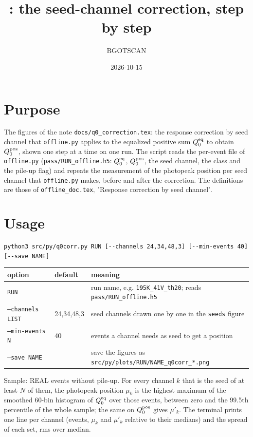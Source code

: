 \documentclass[11pt]{article}
\title{\code{q0corr.py}: the seed-channel correction, step by step}
\author{BGOTSCAN}
\date{2026-10-15}
\newcommand{\code}[1]{\texttt{#1}}
\begin{document}
\maketitle

\section{Purpose}

The figures of the note \code{docs/q0\_correction.tex}: the response
correction by seed channel that \code{offline.py} applies to the
equalized positive sum $Q^{\rm eq}_0$ to obtain $Q^{\rm pos}_0$, shown
one step at a time on one run. The script reads the per-event file of
\code{offline.py} (\code{pass/RUN\_offline.h5}: $Q^{\rm eq}_0$,
$Q^{\rm pos}_0$, the seed channel, the class and the pile-up flag) and
repeats the measurement of the photopeak position per seed channel that
\code{offline.py} makes, before and after the correction. The definitions
are those of \code{offline\_doc.tex}, "Response correction by seed
channel".

\section{Usage}

\begin{lstlisting}
python3 src/py/q0corr.py RUN [--channels 24,34,48,3] [--min-events 40] [--save NAME]
\end{lstlisting}

\begin{center}
\begin{tabular}{l l p{80mm}}
\toprule
option & default & meaning \\
\midrule
\code{RUN} & & run name, e.g. \code{195K\_41V\_th20}; reads \code{pass/RUN\_offline.h5} \\
\code{--channels LIST} & 24,34,48,3 & seed channels drawn one by one in the \code{seeds} figure \\
\code{--min-events N} & 40 & events a channel needs as seed to get a position \\
\code{--save NAME} & & save the figures as \code{src/py/plots/RUN/NAME\_q0corr\_*.png} \\
\bottomrule
\end{tabular}
\end{center}

Sample: REAL events without pile-up. For every channel $k$ that is the
seed of at least $N$ of them, the photopeak position $\mu_k$ is the
highest maximum of the smoothed 60-bin histogram of $Q^{\rm eq}_0$ over
those events, between zero and the 99.5th percentile of the whole
sample; the same on $Q^{\rm pos}_0$ gives $\mu'_k$. The terminal prints
one line per channel (events, $\mu_k$ and $\mu'_k$ relative to their
medians) and the spread of each set, rms over median.
\end{document}
